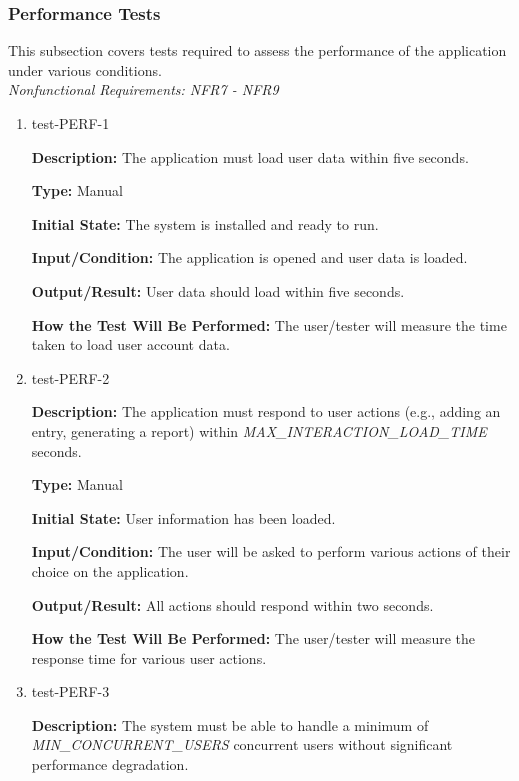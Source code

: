 \documentclass[12pt, titlepage]{article}
\begin{document}
\subsubsection{Performance Tests}

This subsection covers tests required to assess the performance of the application under various conditions.\\
\textit{Nonfunctional Requirements: NFR7 - NFR9}

\begin{enumerate}

\item{test-PERF-1\\}

\textbf{Description:} The application must load user data within five seconds.

\textbf{Type:} Manual
					
\textbf{Initial State:} The system is installed and ready to run.
					
\textbf{Input/Condition:} The application is opened and user data is loaded.
					
\textbf{Output/Result:} User data should load within five seconds.
					
\textbf{How the Test Will Be Performed:} The user/tester will measure the time
taken to load user account data.

\item{test-PERF-2\\}

\textbf{Description:} The application must respond to user actions (e.g., adding
an entry, generating a report) within \textit{MAX\_INTERACTION\_LOAD\_TIME} seconds.

\textbf{Type:} Manual
					
\textbf{Initial State:} User information has been loaded.
					
\textbf{Input/Condition:} The user will be asked to perform various actions of
their choice on the application.
					
\textbf{Output/Result:} All actions should respond within two seconds.
					
\textbf{How the Test Will Be Performed:} The user/tester will measure the
response time for various user actions.


\item{test-PERF-3\\}

\textbf{Description:} The system must be able to handle a minimum of
\textit{MIN\_CONCURRENT\_USERS} concurrent users without significant performance
degradation.


\end{enumerate}
\end{document}
